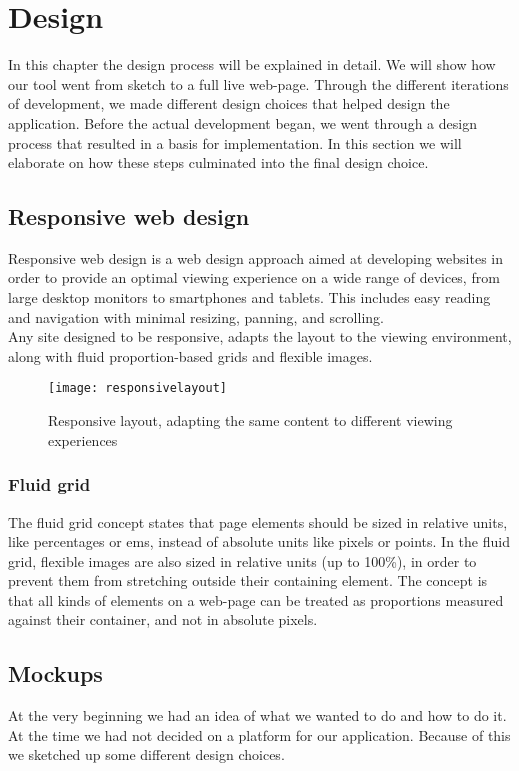 \chapter{Design}
In this chapter the design process will be explained in detail. We will show how our tool went from sketch to a full live web-page. 
Through the different iterations of development, we made different design choices that helped design the application. Before the actual development began, we went
through a design process that resulted in a basis for implementation. In this section we will elaborate on how these steps culminated into the final design choice.
\section{Responsive web design}
Responsive web design\cite{responsivearticle} is a web design approach aimed at developing websites in order to provide an optimal viewing experience on a wide range of devices, from large desktop monitors to smartphones and tablets. This includes easy reading and navigation with minimal resizing, panning, and scrolling.\\
Any site designed to be responsive, adapts the layout to the viewing environment, along with fluid proportion-based grids and flexible images.\\
\begin{figure}[h!]
\label{responsivelayout}
\centering
	\texttt{[image: responsivelayout]}
\caption{Responsive layout, adapting the same content to different viewing experiences}
\end{figure}

\subsection{Fluid grid}

The fluid grid\cite{fluidarticle, fluidgrid} concept states that page elements should be sized in relative units, like percentages or ems, instead of absolute units like pixels or points.  In the fluid grid, flexible images are also sized in relative units (up to 100\%), in order to prevent them from stretching outside their containing element\cite{fluidimages}. The concept is that all kinds of elements on a web-page can be treated as proportions measured against their container, and not in absolute pixels. 

\section{Mockups}
At the very beginning we had an idea of what we wanted to do and how to do it. At the time we had not decided on a platform for our application. Because of this we sketched up some different design choices.

